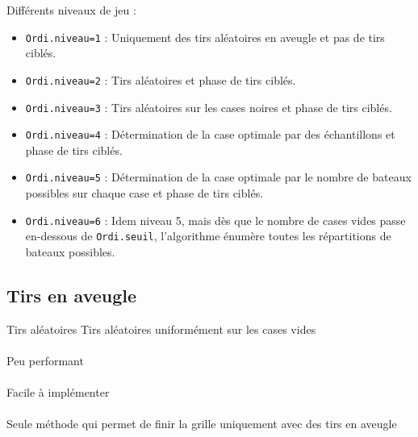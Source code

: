 \begin{frame}
Différents niveaux de jeu :
\begin{itemize}
\item<1> \texttt{Ordi.niveau=1} : Uniquement des tirs aléatoires en aveugle et pas de tirs ciblés.
\item<2> \texttt{Ordi.niveau=2} : Tirs aléatoires et phase de tirs ciblés.
\item<3> \texttt{Ordi.niveau=3} : Tirs aléatoires sur les cases noires  et phase de tirs ciblés.
\item<4> \texttt{Ordi.niveau=4} : Détermination de la case optimale par des échantillons et phase de tirs ciblés.
\item<5> \texttt{Ordi.niveau=5} : Détermination de la case optimale par le nombre de bateaux possibles sur chaque case et phase de tirs ciblés.
\item<6> \texttt{Ordi.niveau=6} : Idem niveau 5, mais dès que le nombre de cases vides passe en-dessous de \texttt{Ordi.seuil}, l'algorithme énumère toutes les répartitions de bateaux possibles.
\end{itemize}
\end{frame}

\subsection{Tirs en aveugle}
\begin{frame}{Tirs aléatoires}
Tirs aléatoires uniformément sur les cases vides\\~\\  \pause
Peu performant\\~\\ \pause
Facile à implémenter\\~\\ \pause
Seule méthode qui permet de finir la grille uniquement avec des tirs en aveugle
\end{frame}


